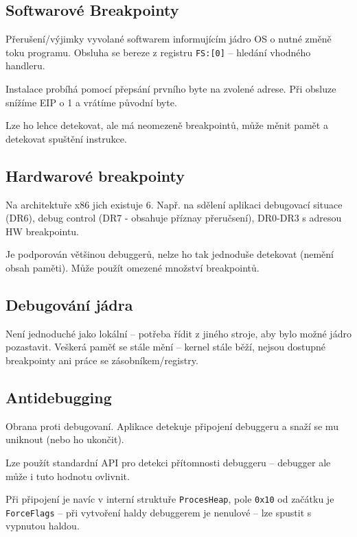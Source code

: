 \subsection*{Softwarové Breakpointy}

Přerušení/výjimky vyvolané softwarem informujícím jádro OS o nutné změně toku programu.
Obsluha se bereze z registru \texttt{FS:[0]} -- hledání vhodného handleru.

Instalace probíhá pomocí přepsání prvního byte na zvolené adrese.
Při obsluze snížíme EIP o 1 a vrátíme původní byte.

Lze ho lehce detekovat, ale má neomezeně breakpointů, může měnit pamět a detekovat spuštění instrukce.

\subsection*{Hardwarové breakpointy}

Na architektuře x86 jich existuje 6.
Např. na sdělení aplikaci debugovací situace (DR6), debug control (DR7 - obsahuje příznay přeručsení), DR0-DR3 s adresou HW breakpointu.

Je podporován většinou debuggerů, nelze ho tak jednoduše detekovat (nemění obsah paměti).
Může použít omezené množství breakpointů.


\subsection*{Debugování jádra}

Není jednoduché jako lokální -- potřeba řídit z jiného stroje, aby bylo možné jádro pozastavit.
Veškerá paměť se stále mění -- kernel stále běží, nejsou dostupné breakpointy ani práce se zásobníkem/registry.

\subsection*{Antidebugging}

Obrana proti debugovaní.
Aplikace detekuje připojení debuggeru a snaží se mu uniknout (nebo ho ukončit).

Lze použít standardní API pro detekci přítomnosti debuggeru -- debugger ale může i tuto hodnotu ovlivnit.

Při připojení je navíc v interní struktuře \texttt{ProcesHeap}, pole \texttt{0x10} od začátku je \texttt{ForceFlags} -- při vytvoření haldy debuggerem je nenulové -- lze spustit s vypnutou haldou.

